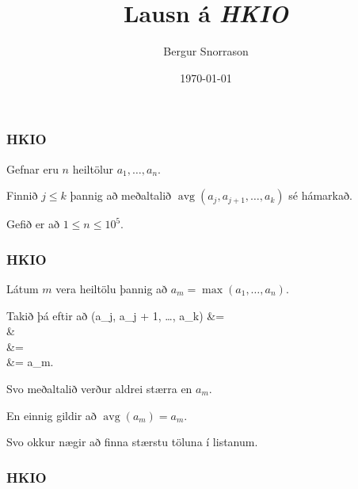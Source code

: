 \title{Lausn á \emph{HKIO}}
\author{Bergur Snorrason}
\date{\today}



\frame{\titlepage}

{
	\frametitle{HKIO}
	{
		\item<1-> Gefnar eru $n$ heiltölur $a_1, \dots, a_n$.
		\item<2-> Finnið $j \leq k$ þannig að meðaltalið $\operatorname{avg}(a_j, a_{j + 1}, \dots, a_k)$ sé hámarkað.
		\item<3-> Gefið er að $1 \leq n \leq 10^5$.
	}
}

{
	\frametitle{HKIO}
	{
		\item<1-> Látum $m$ vera heiltölu þannig að $a_m = \max(a_1, \dots, a_n)$.
		\item<2-> Takið þá eftir að 
		{
				(a_j, a_{j + 1}, \dots, a_k)
				&= \\
				&\leq {}\\
				&= \\
				&= a_m.
		}
		\item<3-> Svo meðaltalið verður aldrei stærra en $a_m$.
		\item<4-> En einnig gildir að $\operatorname{avg}(a_m) = a_m$.
		\item<5-> Svo okkur nægir að finna stærstu töluna í listanum.
	}
}

{
	\frametitle{HKIO}
}

{
}


